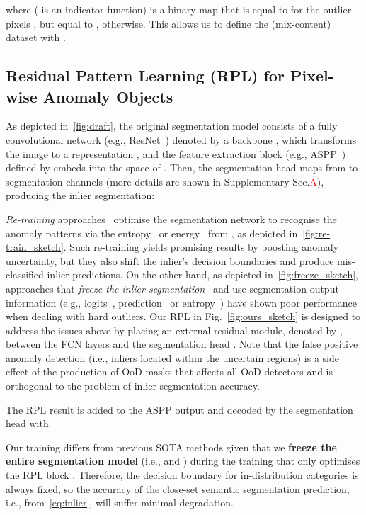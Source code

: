 \documentclass[10pt,twocolumn,letterpaper]{article}
\begin{document}
 where 
 ( is an indicator function) is a binary map that is equal to  for the outlier pixels 
, but equal to , otherwise. 
This allows us to define the  (mix-content) dataset with . 

\subsection{Residual Pattern Learning (RPL) for Pixel-wise Anomaly Objects}




As depicted in~\cref{fig:draft}, the original segmentation model consists of a fully convolutional network (e.g., ResNet~\cite{he2016deep}) denoted by a backbone , which transforms the image to a representation 
, 
and the feature extraction block (e.g., ASPP~\cite{chen2018encoder}) defined by  embeds  into the space of .
Then, the segmentation head  maps from  to  segmentation channels (more details are shown in Supplementary Sec.\textcolor{red}{A}), producing the inlier segmentation:


\textit{Re-training} approaches~\cite{tian2021pixel,grcic2022densehybrid,chan2021entropy} optimise the segmentation network to recognise the anomaly patterns via
the entropy~\cite{grcic2022densehybrid, chan2021entropy} or energy~\cite{tian2021pixel} from , as depicted in~\cref{fig:re-train_sketch}. Such re-training yields promising results by boosting anomaly uncertainty, but they also shift the inlier's decision boundaries and produce mis-classified inlier predictions. 
On the other hand, as depicted in~\cref{fig:freeze_sketch}, approaches that \textit{freeze the inlier segmentation}~\cite{di2021pixel,jung2021standardized,hendrycks2016baseline,mukhoti2018evaluating} and use segmentation output information (e.g., logits~\cite{jung2021standardized}, prediction~\cite{hendrycks2016baseline} or entropy~\cite{di2021pixel}) have shown poor performance when dealing with hard outliers. 
Our RPL in Fig.~\ref{fig:ours_sketch} is designed to address the issues above by placing an external residual module, denoted by
, between the FCN layers  and the segmentation head . 
Note that the false positive anomaly detection (i.e., inliers located within the uncertain regions) is a side effect of the production of OoD masks that affects all OoD detectors and is orthogonal to the problem of inlier segmentation accuracy.

The RPL result is added to the ASPP output and decoded by the segmentation head with 

Our training differs from previous SOTA methods given that we \textbf{freeze the entire segmentation model} (i.e.,  and ) during the training that only optimises the RPL block . Therefore, the decision boundary for in-distribution categories is always fixed, so the accuracy of the close-set semantic segmentation prediction, i.e.,   from~\eqref{eq:inlier}, will suffer minimal degradation.
\end{document}
